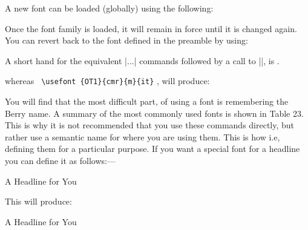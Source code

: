 \begin{multicols*}{2}
A new font can be loaded (globally) using the following:

\begin{teX}
%
\fontsize{17pt}{21pt}
\selectfont
\end{teX}

Once the font family is loaded, it will remain in force until it is changed again. You can revert back to the font defined in the preamble by using:

\begin{teX}
\normalfont\normalsize
\end{teX}

A short hand for the equivalent |\font...|  commands followed by a call to
|\selectfont|, is .

\begin{teX}
\end{teX}

\fox

whereas \verb+ \usefont {OT1}{cmr}{m}{it}+ , will produce:

\fox
\normalfont\normalsize

You will find that the most difficult part, of using a font is remembering the Berry name. A summary of the most commonly used fonts is shown in Table 23.  This is why it is not recommended that you use these commands directly, but rather use a semantic name for where you are using them. This is how  \alltex i.e, defining them for a particular purpose. If you want a special font for a headline you can define it as follows:--- 

\begin{teX}
\newcommand{\headline}[1]{\fontencoding{OT1}%
   \fontfamily{cmss}\fontseries{m}\fontshape{it}%
   \fontsize{17pt}{21pt}\selectfont #1 
   \normalfont\normalsize}
\headline{A Headline for You}
\end{teX}

\noindent This will produce:

\newcommand{\headline}[1]{\fontencoding{OT1}%
\fontfamily{cmss}\fontseries{m}%
\fontsize{17pt}{21pt}\selectfont #1 \normalfont\normalsize}

\headline{A Headline for You}

\end{multicols*}



